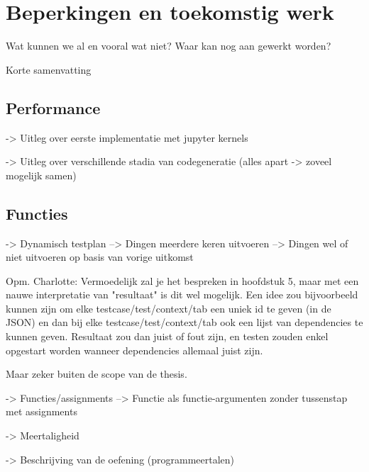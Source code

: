 \chapter{Beperkingen en toekomstig werk}\label{ch:beperkingen-en-toekomstig-werk}

Wat kunnen we al en vooral wat niet?
Waar kan nog aan gewerkt worden?

Korte samenvatting

\section{Performance}

-> Uitleg over eerste implementatie met jupyter kernels

-> Uitleg over verschillende stadia van codegeneratie (alles apart -> zoveel mogelijk samen)

\section{Functies}

-> Dynamisch testplan
--> Dingen meerdere keren uitvoeren
--> Dingen wel of niet uitvoeren op basis van vorige uitkomst

Opm. Charlotte: Vermoedelijk zal je het bespreken in hoofdstuk 5, maar met een nauwe interpretatie van "resultaat" is dit wel mogelijk. Een idee zou bijvoorbeeld kunnen zijn om elke testcase/test/context/tab een uniek id te geven (in de JSON) en dan bij elke testcase/test/context/tab ook een lijst van dependencies te kunnen geven. Resultaat zou dan juist of fout zijn, en testen zouden enkel opgestart worden wanneer dependencies allemaal juist zijn.

Maar zeker buiten de scope van de thesis.


-> Functies/assignments
--> Functie als functie-argumenten zonder tussenstap met assignments

-> Meertaligheid

-> Beschrijving van de oefening (programmeertalen)
